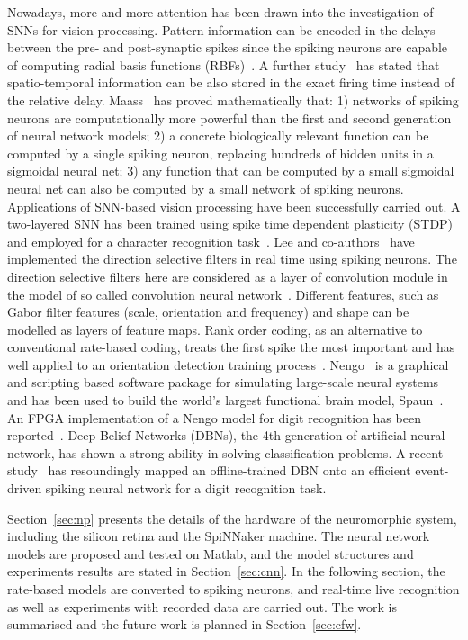 \documentclass[journal]{journal}
\begin{document}
Nowadays, more and more attention has been drawn into the investigation of SNNs for vision processing. 
Pattern information can be encoded in the delays between the pre- and post-synaptic spikes since the spiking neurons are capable of computing radial basis functions (RBFs)~\cite{hopfield1995pattern}.  
A further study~\cite{natschlager1998spatial} has stated that spatio-temporal information can be also stored in the exact firing time instead of the relative delay. Maass~\cite{maass1997networks} has proved mathematically that:
1) networks of spiking neurons are computationally more powerful than the first and second generation of neural network models;
2) a concrete biologically relevant function can be computed by a single spiking neuron, replacing  hundreds of hidden units in a sigmoidal neural net;
3) any function that can be computed by a small sigmoidal neural net can also be computed by a small network of spiking neurons.
Applications of SNN-based vision processing have been successfully carried out. 
A two-layered SNN has been trained using spike time dependent plasticity (STDP) and employed for a character recognition task~\cite{gupta2007character}. 
Lee and co-authors~\cite{6467270} have implemented the direction selective filters in real time using spiking neurons. 
The direction selective filters here are considered as a layer of convolution module in the model of so called convolution neural network~\cite{camunas2012event}. 
Different features, such as Gabor filter features (scale, orientation and frequency) and shape can be modelled as layers of feature maps. 
Rank order coding, as an alternative to conventional rate-based coding, treats the first spike the most important and has well applied to an orientation detection training process~\cite{delorme2001networks}. 
Nengo~\cite{eliasmith2011nengo} is a graphical and scripting based software package for simulating large-scale neural systems and has been used to build the world's largest functional brain model, Spaun~\cite{eliasmith2012large}. An FPGA implementation of a Nengo model for digit recognition has been reported~\cite{naylor2013managing}. 
Deep Belief Networks (DBNs), the 4th generation of artificial neural network, has shown a strong ability in solving classification problems. 
A recent study~\cite{o2013real} has resoundingly mapped an offline-trained DBN onto an efficient event-driven spiking neural network for a digit recognition task.

Section~\ref{sec:np} presents the details of the hardware of the neuromorphic system, including the silicon retina and the SpiNNaker machine.
The neural network models are proposed and tested on Matlab, and the model structures and experiments results are stated in Section~\ref{sec:cnn}.
In the following section, the rate-based models are converted to spiking neurons, and real-time live recognition as well as experiments with recorded data are carried out.
The work is summarised and the future work is planned in Section~\ref{sec:cfw}.
\end{document}
